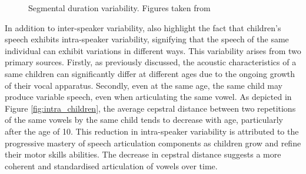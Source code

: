 \begin{figure}[ht]
\centering
{}
\caption{Segmental duration variability. Figures taken from \cite{Acoustic_change_children}}
\end{figure}


In addition to inter-speaker variability, \cite{Acoustic_change_children} also highlight the fact that children's speech exhibits intra-speaker variability, signifying that the speech of the same individual can exhibit variations in different ways. This variability arises from two primary sources. Firstly, as previously discussed, the acoustic characteristics of a same children can significantly differ at different ages due to the ongoing growth of their vocal apparatus.  Secondly, even at the same age, the same child may produce variable speech, even when articulating the same vowel. As depicted in Figure \ref{fig:intra_children}, the average cepstral distance between two repetitions of the same vowels by the same child tends to decrease with age, particularly after the age of 10. This reduction in intra-speaker variability is attributed to the progressive mastery of speech articulation components as children grow and refine their motor skills abilities. The decrease in cepstral distance suggests a more coherent and standardised articulation of vowels over time.

